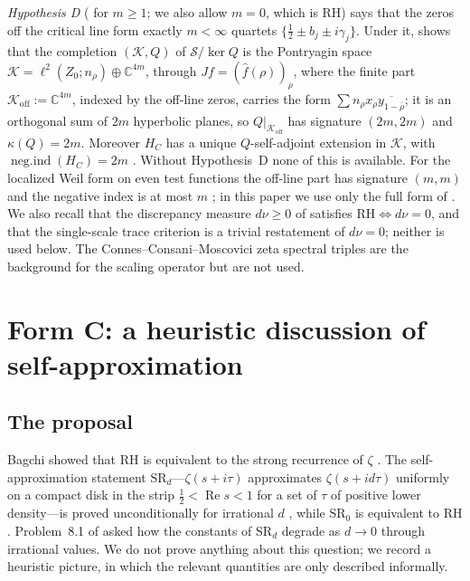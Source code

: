 \documentclass[11pt]{amsart}
\theoremstyle{definition}
\theoremstyle{remark}
\newcommand{\RH}{\mathrm{RH}}
\newcommand{\bbC}{\mathbb{C}}
\newcommand{\Koff}{\mathcal{K}_{\mathrm{off}}}
\newcommand{\negind}{\operatorname{neg.ind}}
\newcommand{\Scal}{\mathcal{S}}
\newcommand{\Kcal}{\mathcal{K}}
\DeclareMathOperator{\Real}{Re}
\begin{document}
\emph{Hypothesis D} (\cite[Def.~2.4]{P25} for $m\ge1$; we also allow $m=0$, which is RH) says that the zeros off the critical line form exactly
$m<\infty$ quartets $\{\tfrac12\pm b_j\pm i\gamma_j\}$. Under it, \cite[Prop.~4.7]{P25}
shows that the completion $(\Kcal,Q)$ of $\Scal/\ker Q$ is the Pontryagin space
$\Kcal=\ell^2(Z_0;n_\rho)\oplus\bbC^{4m}$, through $Jf=(\hat f(\rho))_\rho$, where the finite part
$\Koff:=\bbC^{4m}$, indexed by the off-line zeros, carries the form
$\sum n_\rho x_\rho\overline{y_{1-\bar\rho}}$; it is an orthogonal sum of $2m$ hyperbolic planes,
so $Q|_{\Koff}$ has signature $(2m,2m)$ and $\kappa(Q)=2m$. Moreover $H_C$ has a unique
$Q$-self-adjoint extension in $\Kcal$, with $\negind(H_C)=2m$ \cite[Prop.~5.3]{P25}. Without
Hypothesis~D none of this is available. For the localized Weil form on even test functions the
off-line part has signature $(m,m)$ and the negative index is at most $m$
\cite[Thm.~3.1, Cor.~6.5]{P18}; in this paper we use only the full form of \cite{P25}.
We also recall that the discrepancy measure $d\nu\ge0$ of \cite[Cor.~3.2]{P24} satisfies
$\RH\iff d\nu=0$, and that the single-scale trace criterion \cite[Thm.~4.4]{P27} is a trivial
restatement of $d\nu=0$; neither is used below. The Connes--Consani--Moscovici zeta spectral
triples \cite{CCM25} are the background for the scaling operator but are not used.

\section{Form C: a heuristic discussion of self-approximation}\label{sec:formC}

\subsection{The proposal}
Bagchi showed that RH is equivalent to the strong recurrence of $\zeta$ \cite{Bagchi}. The
self-approximation statement $\mathrm{SR}_d$---$\zeta(s+i\tau)$ approximates $\zeta(s+id\tau)$
uniformly on a compact disk in the strip $\tfrac12<\Real s<1$ for a set of $\tau$ of positive
lower density---is proved unconditionally for irrational $d$ \cite{Nak09,Pan10}, while
$\mathrm{SR}_0$ is equivalent to RH \cite{Bagchi}. Problem~8.1 of \cite{P27} asked how the
constants of $\mathrm{SR}_d$ degrade as $d\to0$ through irrational values. We do not prove
anything about this question; we record a heuristic picture, in which the relevant quantities
are only described informally.
\end{document}
